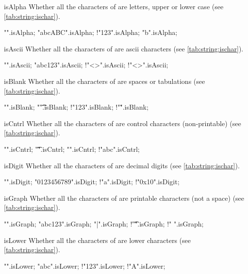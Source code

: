 \begin{urbiscriptapi}
\item[isAlpha] Whether all the characters of \this are letters, upper or
  lower case (see \autoref{tab:string:ischar}).
\begin{urbiassert}
           "".isAlpha;
     "abcABC".isAlpha;
       !"123".isAlpha;  "b".isAlpha;
\end{urbiassert}


\item[isAscii] Whether all the characters of \this are ascii characters
  (see \autoref{tab:string:ischar}).
\begin{urbiassert}[escapeinside=<>]
           "".isAscii;
     "abc123".isAscii;
         !"<>".isAscii; !"<>".isAscii;
\end{urbiassert}


\item[isBlank] Whether all the characters of \this are spaces or tabulations
  (see \autoref{tab:string:ischar}).
\begin{urbiassert}
           "".isBlank;
     "\t \t ".isBlank;
       !"123".isBlank;  !"\v".isBlank;
\end{urbiassert}


\item[isCntrl] Whether all the characters of \this are control characters
  (non-printable) (see \autoref{tab:string:ischar}).
\begin{urbiassert}
           "".isCntrl;
     "\t\n\f".isCntrl;
        "".isCntrl; !"abc".isCntrl;
\end{urbiassert}


\item[isDigit] Whether all the characters of \this are decimal digits (see
  \autoref{tab:string:ischar}).
\begin{urbiassert}
           "".isDigit;
 "0123456789".isDigit;
         !"a".isDigit;  !"0x10".isDigit;
\end{urbiassert}


\item[isGraph] Whether all the characters of \this are printable characters
  (not a space) (see \autoref{tab:string:ischar}).
\begin{urbiassert}
          "".isGraph;
    "abc123".isGraph;
       "{|}".isGraph;
   !"\t\n\r".isGraph; !" ".isGraph;
\end{urbiassert}


\item[isLower] Whether all the characters of \this are lower characters (see
  \autoref{tab:string:ischar}).
\begin{urbiassert}
          "".isLower;
       "abc".isLower;
      !"123".isLower;  !"A".isLower;
\end{urbiassert}



\end{urbiscriptapi}
